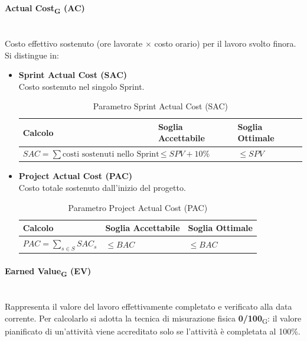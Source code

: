 \documentclass[11pt,a4paper]{article}
\begin{document}
\paragraph{Actual Cost\textsubscript{G} (AC)} \hfill \\
Costo effettivo sostenuto (ore lavorate $\times$ costo orario) per il lavoro svolto finora. Si distingue in:

\begin{itemize}
    \item \textbf{Sprint Actual Cost (SAC)} \\
    Costo sostenuto nel singolo Sprint.
    
    \begin{table}[H]
        \centering
        \renewcommand{\arraystretch}{1.5} %
        \begin{tabular}{|M{0.4\textwidth}|M{0.25\textwidth}|M{0.25\textwidth}|}
            \hline
            \textbf{Calcolo} & \textbf{Soglia Accettabile} & \textbf{Soglia Ottimale} \\
            \hline
            $SAC = \sum \textrm{costi sostenuti nello Sprint}$ & $\le SPV + 10\%$ & $\le SPV$ \\
            \hline
        \end{tabular}
        \caption{Parametro Sprint Actual Cost (SAC)}
    \end{table}

    \item \textbf{Project Actual Cost (PAC)} \\
    Costo totale sostenuto dall'inizio del progetto.

    \begin{table}[H]
        \centering
        \renewcommand{\arraystretch}{1.5} %
        \begin{tabular}{|M{0.4\textwidth}|M{0.25\textwidth}|M{0.25\textwidth}|}
            \hline
            \textbf{Calcolo} & \textbf{Soglia Accettabile} & \textbf{Soglia Ottimale} \\
            \hline
            $PAC = \sum_{s \in S} SAC_s$ & $\le BAC$ & $\le BAC$ \\
            \hline
        \end{tabular}
        \caption{Parametro Project Actual Cost (PAC)}
    \end{table}
\end{itemize}


\paragraph{Earned Value\textsubscript{G} (EV)} \hfill \\
Rappresenta il valore del lavoro effettivamente completato e verificato alla data corrente. Per calcolarlo si adotta la tecnica di misurazione fisica \textbf{0/100}\textsubscript{G}: il valore pianificato di un'attività viene accreditato solo se l'attività è completata al 100\%.
\end{document}
